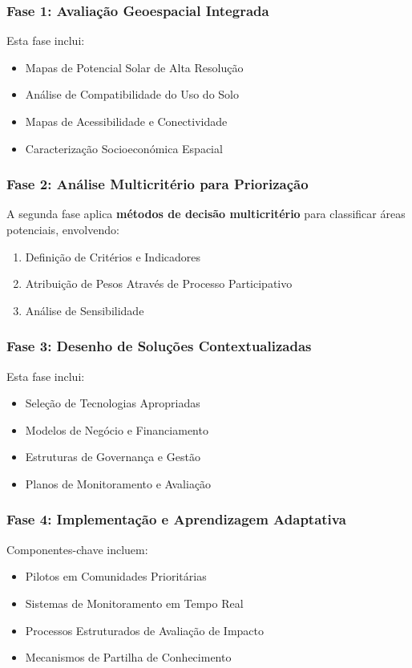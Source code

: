 \documentclass[12pt, a4paper]{article}
\begin{document}
\subsubsection{Fase 1: Avaliação Geoespacial Integrada}

Esta fase inclui:
\begin{itemize}
\item Mapas de Potencial Solar de Alta Resolução
\item Análise de Compatibilidade do Uso do Solo
\item Mapas de Acessibilidade e Conectividade
\item Caracterização Socioeconómica Espacial
\end{itemize}

\subsubsection{Fase 2: Análise Multicritério para Priorização}

A segunda fase aplica \textbf{métodos de decisão multicritério} para classificar áreas potenciais, envolvendo:
\begin{enumerate}
\item Definição de Critérios e Indicadores
\item Atribuição de Pesos Através de Processo Participativo
\item Análise de Sensibilidade
\end{enumerate}

\subsubsection{Fase 3: Desenho de Soluções Contextualizadas}

Esta fase inclui:
\begin{itemize}
\item Seleção de Tecnologias Apropriadas
\item Modelos de Negócio e Financiamento
\item Estruturas de Governança e Gestão
\item Planos de Monitoramento e Avaliação
\end{itemize}

\subsubsection{Fase 4: Implementação e Aprendizagem Adaptativa}

Componentes-chave incluem:
\begin{itemize}
\item Pilotos em Comunidades Prioritárias
\item Sistemas de Monitoramento em Tempo Real
\item Processos Estruturados de Avaliação de Impacto
\item Mecanismos de Partilha de Conhecimento
\end{itemize}
\end{document}
